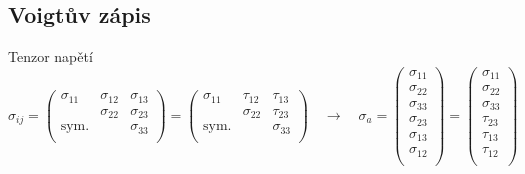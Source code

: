 \subsection{Voigtův zápis}
Tenzor napětí
\begin{equation*}
	\sigma_{ij} =
	\begin{pmatrix}
		\sigma_{11} & \sigma_{12} & \sigma_{13} \\ & \sigma_{22} & \sigma_{23} \\ \text{sym.} & & \sigma_{33} \\
	\end{pmatrix} =
	\begin{pmatrix}
		\sigma_{11} & \tau_{12} & \tau_{13} \\ & \sigma_{22} & \tau_{23} \\ \text{sym.} & & \sigma_{33} \\
	\end{pmatrix}
	\quad\rightarrow\quad
	\sigma_a =
	\begin{pmatrix}
		\sigma_{11} \\ \sigma_{22} \\ \sigma_{33} \\ \sigma_{23} \\ \sigma_{13} \\ \sigma_{12} \\
	\end{pmatrix} =
	\begin{pmatrix}
		\sigma_{11} \\ \sigma_{22} \\ \sigma_{33} \\ \tau_{23} \\ \tau_{13} \\ \tau_{12} \\
	\end{pmatrix}
\end{equation*}

